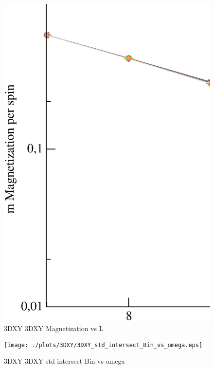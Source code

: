 \begin{figure}[!htpb]
  \centering
  \includegraphics[width=\textwidth]{./plots/3DXY/3DXY_Magnetization_vs_L.eps}
  \caption{3DXY 3DXY Magnetization vs L}
\end{figure}

\begin{figure}[!htpb]
  \centering
  \texttt{[image: ./plots/3DXY/3DXY\_std\_intersect\_Bin\_vs\_omega.eps]}
  \caption{3DXY 3DXY std intersect Bin vs omega}
\end{figure}

